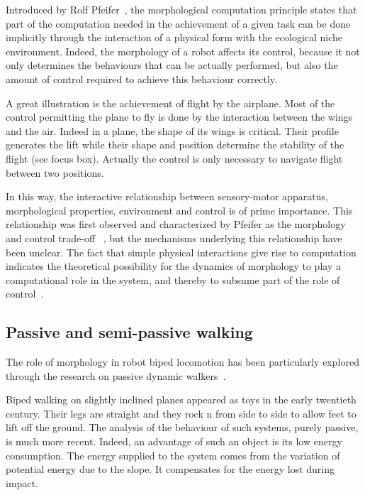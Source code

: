 Introduced by Rolf Pfeifer~\cite{pfeifer2005morphological}, the morphological computation principle states that part of the computation needed in the achievement of a given task can be done implicitly through the interaction of a physical form with the ecological niche environment.
Indeed, the morphology of a robot affects its control, because it not only determines the behaviours that can be actually performed, but also the amount of control required to achieve this behaviour correctly.

A great illustration is the achievement of flight by the airplane. Most of the control permitting the plane to fly is done by the interaction between the wings and the air. Indeed in a plane, the shape of its wings is critical. Their profile generates the lift while their shape and position determine the stability of the flight (see focus box). Actually the control is only necessary to navigate flight between two positions.

In this way, the interactive relationship between sensory-motor apparatus, morphological properties, environment and control is of prime importance. This relationship was first observed and characterized by Pfeifer as the morphology and control trade-off ~\cite{pfeifer2001understanding}, but the mechanisms underlying this relationship have been unclear. The fact that simple physical interactions give rise to computation indicates the theoretical possibility for the dynamics of morphology to play a computational role in the system, and thereby to subsume part of the role of control~\cite{paulinvestigation}.


\subsection{Passive and semi-passive walking} %

The role of morphology in robot biped locomotion has been particularly explored through the research on passive dynamic walkers~\cite{wisse2007passive}.

Biped walking on slightly inclined planes appeared as toys in the early twentieth century. Their legs are straight and they rock n from side to side to allow feet to lift off the ground. The analysis of the behaviour of such systems, purely passive, is much more recent. Indeed, an advantage of such an object is its low energy consumption. The energy supplied to the system comes from the variation of potential energy due to the slope. It compensates for the energy lost during impact.

